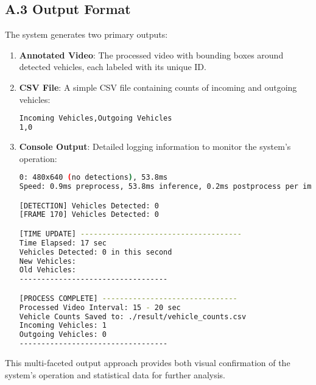 \documentclass[9pt,a4paper,twoside]{rho-class/rho}
\begin{document}
    \subsection*{A.3 Output Format}
    
    The system generates two primary outputs:
    
    \begin{enumerate}
        \item \textbf{Annotated Video}: The processed video with bounding boxes around detected vehicles, each labeled with its unique ID.
        
        \item \textbf{CSV File}: A simple CSV file containing counts of incoming and outgoing vehicles:
        \begin{lstlisting}[caption=CSV output format, language=bash]
Incoming Vehicles,Outgoing Vehicles
1,0
        \end{lstlisting}
        
        \item \textbf{Console Output}: Detailed logging information to monitor the system's operation:
        \begin{lstlisting}[caption=Console output example, language=bash]
0: 480x640 (no detections), 53.8ms
Speed: 0.9ms preprocess, 53.8ms inference, 0.2ms postprocess per image at shape (1, 3, 480, 640)

[DETECTION] Vehicles Detected: 0
[FRAME 170] Vehicles Detected: 0

[TIME UPDATE] -------------------------------------
Time Elapsed: 17 sec
Vehicles Detected: 0 in this second
New Vehicles:
Old Vehicles:
----------------------------------

[PROCESS COMPLETE] -------------------------------
Processed Video Interval: 15 - 20 sec
Vehicle Counts Saved to: ./result/vehicle_counts.csv
Incoming Vehicles: 1
Outgoing Vehicles: 0
----------------------------------
\end{lstlisting}
    \end{enumerate}
    
    This multi-faceted output approach provides both visual confirmation of the system's operation and statistical data for further analysis.


\printbibliography

\end{document}
